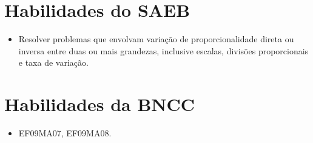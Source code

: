 \section{Habilidades do SAEB}

\begin{itemize}
  \item Resolver problemas que envolvam variação de proporcionalidade direta
ou inversa entre duas ou mais grandezas, inclusive escalas, divisões
proporcionais e taxa de variação.   
\end{itemize} 

\section*{Habilidades da BNCC}

\begin{itemize}
  \item EF09MA07, EF09MA08.
\end{itemize}

